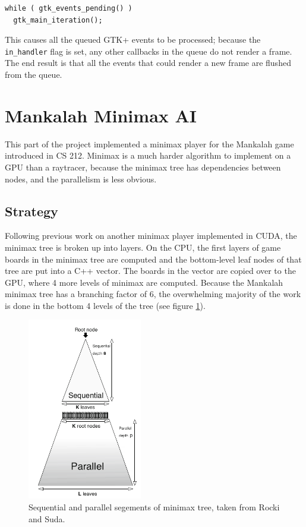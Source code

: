 \documentclass{article}
\begin{document}
\begin{lstlisting}
while ( gtk_events_pending() )
  gtk_main_iteration();
\end{lstlisting}

This causes all the queued GTK+ events to be processed; because the \texttt{in\_handler} flag is set, any other callbacks in the queue do not render a frame. The end result is that all the events that could render a new frame are flushed from the queue.

\section{Mankalah Minimax AI}
This part of the project implemented a minimax player for the Mankalah game introduced in CS 212. Minimax is a much harder algorithm to implement on a GPU than a raytracer, because the minimax tree has dependencies between nodes, and the parallelism is less obvious.

\subsection{Strategy}
Following previous work on another minimax player implemented in CUDA\cite{rockisuda10}, the minimax tree is broken up into layers. On the CPU, the first layers of game boards in the minimax tree are computed and the bottom-level leaf nodes of that tree are put into a C++ vector. The boards in the vector are copied over to the GPU, where 4 more levels of minimax are computed. Because the Mankalah minimax tree has a branching factor of 6, the overwhelming majority of the work is done in the bottom 4 levels of the tree (see figure \ref{fig:minimaxdiagram}).

\begin{figure}[ht!]
\centering
\includegraphics[width=50mm]{minimax-diagram.png}
\caption{Sequential and parallel segements of minimax tree, taken from Rocki and Suda\cite{rockisuda10}.}
\label{fig:minimaxdiagram}
\end{figure}
\end{document}
